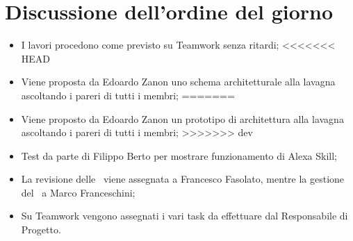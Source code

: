 \documentclass[../verbale-2017-02-21.tex]{subfiles}
\begin{document}
	\section{Discussione dell'ordine del giorno}
	\begin{itemize}
		\item I lavori procedono come previsto su Teamwork senza ritardi;
<<<<<<< HEAD
		\item Viene proposta da Edoardo Zanon uno schema architetturale alla lavagna ascoltando i pareri di tutti i membri;
=======
		\item Viene proposto da Edoardo Zanon un prototipo di architettura alla lavagna ascoltando i pareri di tutti i membri;
>>>>>>> dev
		\item Test da parte di Filippo Berto per mostrare funzionamento di Alexa Skill;
		\item La revisione delle \normediprogettoRR\ viene assegnata a Francesco Fasolato, mentre la gestione del \pianodiqualificaRR\ a Marco Franceschini;
		\item Su Teamwork vengono assegnati i vari task da effettuare dal Responsabile di Progetto.
	\end{itemize}
\end{document}
